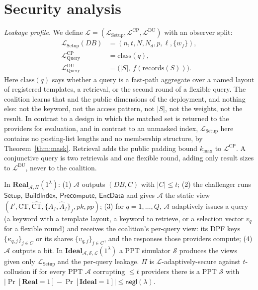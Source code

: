 \documentclass[a4paper,fleqn]{cas-dc}
\newcommand{\negl}{\mathsf{negl}}
\newcommand{\PPT}{\mathrm{PPT}}
\newcommand{\Real}{\mathbf{Real}}
\newcommand{\Ideal}{\mathbf{Ideal}}
\newcommand{\Leak}{\mathcal{L}}
\newcommand{\Sim}{\mathcal{S}}
\newcommand{\Adv}{\mathcal{A}}
\begin{document}
\section{Security analysis}
\label{sec:security}

\emph{Leakage profile.} We define
$\Leak=(\Leak_{\mathrm{Setup}},\Leak^{\text{CP}},\Leak^{\text{DU}})$ with an
observer split:
\begin{align*}
\Leak_{\mathrm{Setup}}(DB) &= (n,t,N,N_d,p,\ell,\{w_f\}),\\
\Leak^{\text{CP}}_{\mathrm{Query}} &= \mathrm{class}(q),\\
\Leak^{\text{DU}}_{\mathrm{Query}} &= \big(|S|,\ f(\mathrm{records}(S))\big).
\end{align*}
Here $\mathrm{class}(q)$ says whether a query is a fast-path aggregate over a
named layout of registered templates, a retrieval, or the second round of a
flexible query. The coalition learns that and the public dimensions of the
deployment, and nothing else: not the keyword, not the access pattern, not
$|S|$, not the weights, not the result. In contrast to a design in which
the matched set is returned to the providers for evaluation, and in contrast
to an unmasked index, $\Leak_{\mathrm{Setup}}$ here contains no posting-list
lengths and no membership structure, by Theorem~\ref{thm:mask}. Retrieval adds
the public padding bound $k_{\max}$ to $\Leak^{\text{CP}}$. A conjunctive
query is two retrievals and one flexible round, adding only result sizes to
$\Leak^{\text{DU}}$, never to the coalition.

\begin{definition}[$\Leak$-security against $t$-collusion]
\label{def:sec}
In $\Real_{\Adv,\Pi}(1^\lambda)$: (1) $\Adv$ outputs $(DB,C)$ with $|C|\le t$;
(2) the challenger runs $\mathsf{Setup}$, $\mathsf{BuildIndex}$,
$\mathsf{Precompute}$, $\mathsf{EncData}$ and gives $\Adv$ the static view
$(I',\text{CT},\widehat{\text{CT}},\{A_f,\widehat A_f\}_f,pk,pp)$;
(3) for $q=1,\dots,Q$, $\Adv$ adaptively issues a query (a keyword with a
template layout, a keyword to retrieve, or a selection vector $v_q$ for a
flexible round) and receives the coalition's per-query view: its DPF keys
$\{\kappa_{q,j}\}_{j\in C}$ or its shares $\{v_{q,j}\}_{j\in C}$, and the
responses those providers compute; (4) $\Adv$
outputs a bit. In $\Ideal_{\Adv,\Sim,\Leak}(1^\lambda)$ a $\PPT$ simulator
$\Sim$ produces the views given only $\Leak_{\mathrm{Setup}}$ and the
per-query leakage. $\Pi$ is $\Leak$-adaptively-secure against $t$-collusion if
for every $\PPT$ $\Adv$ corrupting $\le t$ providers there is a $\PPT$ $\Sim$
with $|\Pr[\Real=1]-\Pr[\Ideal=1]|\le\negl(\lambda)$.
\end{definition}
\end{document}
